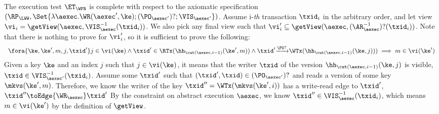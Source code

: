 The execution test $\ET_\WFR$ is complete with respect to the axiomatic specification 
\( (\RP_{\LWW}, \Set{\lambda \aexec. \WR(\aexec', \ke) ; (\PO_{\aexec'})? ; \VIS_{\aexec'} })\).
Assume i-\emph{th} transaction \( \txid_i \) in the arbitrary order,
and let view \( \vi_{i} = \getView(\aexec, \VIS^{-1}_{\aexec}(\txid_{i}) ) \).
We also pick any final view such that \( \vi'_{i} \subseteq \getView(\aexec, (\AR^{-1}_{\aexec})?(\txid_{i}) ) \).
Note that there is nothing to prove for \( \vi'_i \),
so it is sufficient to prove the following:
\[
    \begin{array}{l}
    \fora{\ke, \ke', m, j, \txid'} j \in \vi(\ke)
    \land \txid' \in \RTx(\hh_{\cut(\aexec, i-1)}(\ke', m)) \land \txid' {\xrightarrow{\PO?}} \WTx(\hh_{\cut(\aexec, i-1)}(\ke, j)) ) 
    \implies m \in \vi(\ke')
    \end{array}
\]
Given a key \( \ke \) and an index \( j \) such that \( j \in \vi(\ke) \), 
it means that the writer \( \txid \) of the version \( \hh_{\cut(\aexec, i-1)}(\ke, j) \) is visible, \ie \( \txid \in \VIS_{\aexec'}^{-1}(\txid_i) \).
Assume some \( \txid' \) such that \( (\txid', \txid) \in (\PO_{\aexec'})? \) and reads a version of some key \( \mkvs(\ke',m) \).
Therefore, we know the writer of the key \( \txid'' = \WTx(\mkvs(\ke',i)) \) has a write-read edge to \( \txid' \), \ie \( \txid'' \toEdge{\WR_\aexec} \txid'\) 
By the constraint on abstract execution \( \aexec \), we know \( \txid'' \in \VIS^{-1}_{\aexec}(\txid_{i}) \),
which means \( m \in \vi(\ke')\) by the definition of \( \getView \).

